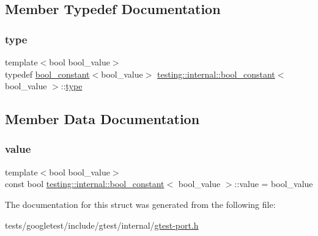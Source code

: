 \subsection{Member Typedef Documentation}
\mbox{\label{structtesting_1_1internal_1_1bool__constant_aba6d09ecf7eecea6c93480f0d627a167}} 
\subsubsection{\texorpdfstring{type}{type}}
{\footnotesize\ttfamily template$<$bool bool\+\_\+value$>$ \\
typedef \hyperlink{structtesting_1_1internal_1_1bool__constant}{bool\+\_\+constant}$<$bool\+\_\+value$>$ \hyperlink{structtesting_1_1internal_1_1bool__constant}{testing\+::internal\+::bool\+\_\+constant}$<$ bool\+\_\+value $>$\+::\hyperlink{structtesting_1_1internal_1_1bool__constant_aba6d09ecf7eecea6c93480f0d627a167}{type}}



\subsection{Member Data Documentation}
\mbox{\label{structtesting_1_1internal_1_1bool__constant_a499fba6576296b04d99690a486424b32}} 
\subsubsection{\texorpdfstring{value}{value}}
{\footnotesize\ttfamily template$<$bool bool\+\_\+value$>$ \\
const bool \hyperlink{structtesting_1_1internal_1_1bool__constant}{testing\+::internal\+::bool\+\_\+constant}$<$ bool\+\_\+value $>$\+::value = bool\+\_\+value\hspace{0.3cm}{\ttfamily [static]}}



The documentation for this struct was generated from the following file\+:\begin{DoxyCompactItemize}
\item 
tests/googletest/include/gtest/internal/\hyperlink{gtest-port_8h}{gtest-\/port.\+h}\end{DoxyCompactItemize}
